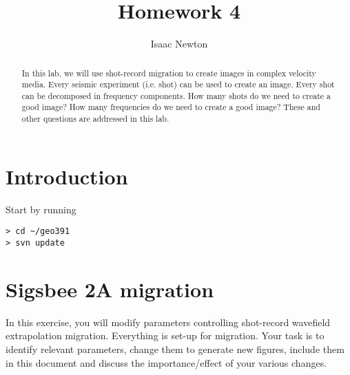 \author{Isaac Newton}
\title{Homework 4}

\begin{abstract}
In this lab, we will use shot-record migration to create 
images in complex velocity media.
Every seismic experiment (i.e. shot) can be used to create
an image. Every shot can be decomposed in frequency
components. 
How many shots do we need to create a good image?
How many frequencies do we need to create a good image?
These and other questions are addressed in this lab.
\end{abstract}


\section{Introduction}

Start by running
\begin{verbatim}
> cd ~/geo391
> svn update
\end{verbatim}

\section{Sigsbee 2A migration}
In this exercise, you will modify parameters controlling 
shot-record wavefield extrapolation migration.
Everything is set-up for migration. Your task is to
identify relevant parameters, change them to generate 
new figures, include them in this document and discuss
the importance/effect of your various changes.


